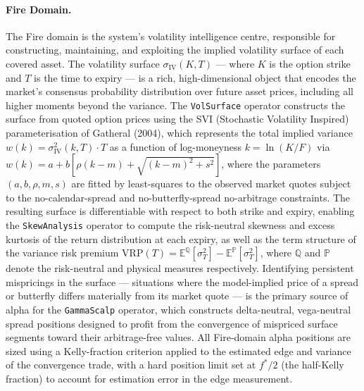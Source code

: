 \documentclass[12pt,openany]{book}
\numberwithin{equation}{chapter}
\theoremstyle{plain}
\theoremstyle{definition}
\theoremstyle{remark}
\begin{document}
\paragraph{Fire Domain.}
The Fire domain is the system's volatility intelligence centre, responsible for constructing, maintaining, and exploiting the implied volatility surface of each covered asset. The volatility surface $\sigma_{\mathrm{IV}}(K, T)$ — where $K$ is the option strike and $T$ is the time to expiry — is a rich, high-dimensional object that encodes the market's consensus probability distribution over future asset prices, including all higher moments beyond the variance. The \texttt{VolSurface} operator constructs the surface from quoted option prices using the SVI (Stochastic Volatility Inspired) parameterisation of Gatheral (2004), which represents the total implied variance $w(k) = \sigma_{\mathrm{IV}}^2(k, T) \cdot T$ as a function of log-moneyness $k = \ln(K/F)$ via $w(k) = a + b[\rho(k - m) + \sqrt{(k-m)^2 + s^2}]$, where the parameters $(a, b, \rho, m, s)$ are fitted by least-squares to the observed market quotes subject to the no-calendar-spread and no-butterfly-spread no-arbitrage constraints. The resulting surface is differentiable with respect to both strike and expiry, enabling the \texttt{SkewAnalysis} operator to compute the risk-neutral skewness and excess kurtosis of the return distribution at each expiry, as well as the term structure of the variance risk premium $\mathrm{VRP}(T) = \mathbb{E}^{\mathbb{Q}}[\sigma^2_T] - \mathbb{E}^{\mathbb{P}}[\sigma^2_T]$, where $\mathbb{Q}$ and $\mathbb{P}$ denote the risk-neutral and physical measures respectively. Identifying persistent mispricings in the surface — situations where the model-implied price of a spread or butterfly differs materially from its market quote — is the primary source of alpha for the \texttt{GammaScalp} operator, which constructs delta-neutral, vega-neutral spread positions designed to profit from the convergence of mispriced surface segments toward their arbitrage-free values. All Fire-domain alpha positions are sized using a Kelly-fraction criterion applied to the estimated edge and variance of the convergence trade, with a hard position limit set at $f^* / 2$ (the half-Kelly fraction) to account for estimation error in the edge measurement.
\end{document}
